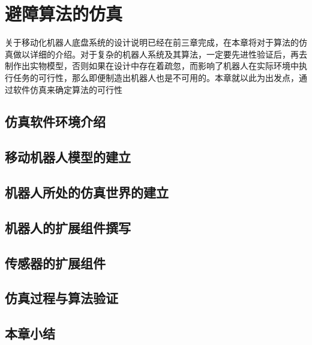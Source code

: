 

\chapter{避障算法的仿真}
\label{chap:simulation}
关于移动化机器人底盘系统的设计说明已经在前三章完成，在本章将对于算法的仿真做以详细的介绍。对于复杂的机器人系统及其算法，一定要先进性验证后，再去制作出实物模型，否则如果在设计中存在着疏忽，而影响了机器人在实际环境中执行任务的可行性，那么即便制造出机器人也是不可用的。本章就以此为出发点，通过软件仿真来确定算法的可行性
\section{仿真软件环境介绍}
\section{移动机器人模型的建立}
\section{机器人所处的仿真世界的建立}
\section{机器人的扩展组件撰写}
\section{传感器的扩展组件}
\section{仿真过程与算法验证}
\section{本章小结}

